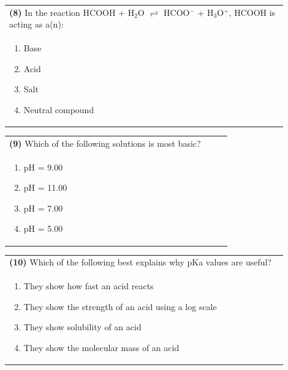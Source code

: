 \documentclass{article}
\begin{document}
\noindent\begin{tabular}{|p{0.9\linewidth}|}
\hline
\textbf{(8)} In the reaction HCOOH + H$_2$O $\rightleftharpoons$ HCOO$^-$ + H$_3$O$^+$, HCOOH is acting as a(n): \\[0.2cm]
\begin{minipage}{0.85\linewidth}
\begin{enumerate}[label=\alph*.]
\item Base \item Acid \item Salt \item Neutral compound
\end{enumerate}
\end{minipage}\\[0.2cm]
\hline
\end{tabular}
\newpage

\noindent\begin{tabular}{|p{0.9\linewidth}|}
\hline
\textbf{(9)} Which of the following solutions is most basic? \\[0.2cm]
\begin{minipage}{0.85\linewidth}
\begin{enumerate}[label=\alph*.]
\item pH = 9.00 \item pH = 11.00 \item pH = 7.00 \item pH = 5.00
\end{enumerate}
\end{minipage}\\[0.2cm]
\hline
\end{tabular}

\noindent\begin{tabular}{|p{0.9\linewidth}|}
\hline
\textbf{(10)} Which of the following best explains why pKa values are useful? \\[0.2cm]
\begin{minipage}{0.85\linewidth}
\begin{enumerate}[label=\alph*.]
\item They show how fast an acid reacts
\item They show the strength of an acid using a log scale
\item They show solubility of an acid
\item They show the molecular mass of an acid
\end{enumerate}
\end{minipage}\\[0.2cm]
\hline
\end{tabular}
\end{document}
